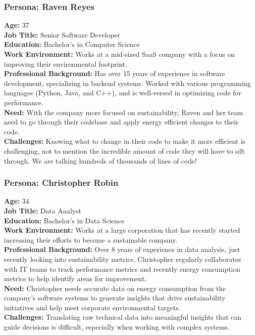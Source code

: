 \documentclass[12pt]{article}
\begin{document}
\subsubsection*{Persona: Raven Reyes}
\textbf{Age:} 37\\
\textbf{Job Title:} Senior Software Developer\\
\textbf{Education:} Bachelor's in Computer 
Science\\[2mm]
\textbf{Work Environment:} Works at a mid-sized SaaS company with a focus on improving their environmental footprint.\\
\textbf{Professional Background:} Has over 15 years of experience in software development, specializing in backend systems. Worked with various programming languages (Python, Java, and C++), and is well-versed in optimizing code for performance.\\[2mm]
\textbf{Need:} With the company more focused on sustainability, Raven and her team need to go through their codebase and apply energy efficient changes to their code.\\
\textbf{Challenges:} Knowing what to change in their code to make it more efficient is challenging, not to mention the incredible amount of code they will have to sift through. We are talking hundreds of thousands of lines of code!

\subsubsection*{Persona: Christopher Robin}
\textbf{Age:} 34\\
\textbf{Job Title:} Data Analyst\\
\textbf{Education:} Bachelor's in Data Science\\[2mm]
\textbf{Work Environment:} Works at a large corporation that has recently started increasing their efforts to become a sustainable company.\\
\textbf{Professional Background:} Over 8 years of experience in data analysis, just recently looking into sustainability metrics. Christopher regularly collaborates with IT teams to track performance metrics and recently energy consumption metrics to help identify areas for improvement.\\[2mm]
\textbf{Need:} Christopher needs accurate data on energy consumption from the company's software systems to generate insights that drive sustainability initiatives and help meet corporate environmental targets.\\
\textbf{Challenges:} Translating raw technical data into meaningful insights that can guide decisions is difficult, especially when working with complex systems. 
\end{document}
